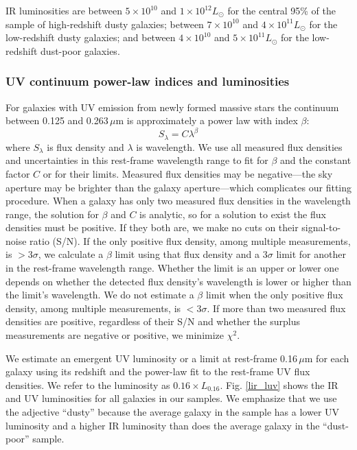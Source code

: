\documentclass[referee]{aa}
\begin{document}
IR luminosities are between $5\times10^{10}$ and $1\times10^{12} L_{\odot}$
for the central 95\% of the sample of high-redshift dusty galaxies; between
$7\times10^{10}$ and $4\times10^{11} L_{\odot}$ for the low-redshift dusty
galaxies; and between $4\times10^{10}$ and $5\times10^{11} L_{\odot}$ for
the low-redshift dust-poor galaxies.

\subsubsection{UV continuum power-law indices and luminosities}

For galaxies with UV emission from newly formed massive stars the continuum
between 0.125 and 0.263$\,\mu$m is approximately a power law with index
$\beta$:
\begin{equation}
S_{\lambda} = C\lambda^{\beta}
\end{equation}
where $S_{\lambda}$ is flux density and $\lambda$ is wavelength.
We use all measured flux densities and uncertainties in this rest-frame
wavelength range to fit for $\beta$ and the constant factor $C$ or
for their limits.  Measured flux densities may be negative---the sky aperture
may be brighter than the galaxy aperture---which
complicates our fitting procedure.  When a galaxy has only two measured flux
densities in the wavelength range, the solution for $\beta$ and $C$ is
analytic, so for a solution to exist the flux densities must be positive.  If
they both are, we make no cuts on their signal-to-noise ratio (S/N).
If the only positive flux density, among multiple measurements, is $> 3\sigma$,
we calculate a $\beta$ limit using that flux density and a $3\sigma$ limit for
another in the rest-frame wavelength range.  Whether the limit is an upper or
lower one depends on whether the detected flux density's wavelength is lower
or higher than the limit's wavelength.  We do not estimate a $\beta$ limit when
the only positive flux density, among multiple measurements, is $< 3\sigma$.
If more than two measured flux densities are positive, regardless of their S/N
and whether the surplus measurements are negative or positive, we minimize
$\chi^{2}$.

We estimate an emergent UV luminosity or a
limit at rest-frame 0.16$\,\mu$m for each galaxy using its redshift and
the power-law fit to the rest-frame UV flux densities.  We refer to the
luminosity as $0.16 \times L_{0.16}$.  Fig. \ref{lir_luv} shows the IR and UV
luminosities for all galaxies in our samples.  We emphasize that we use
the adjective ``dusty'' because the average galaxy in the sample has a lower
UV luminosity and a higher IR luminosity than does the average galaxy in the
``dust-poor'' sample.
\end{document}
